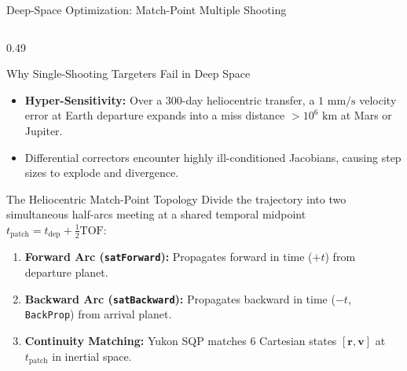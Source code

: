 \documentclass[aspectratio=169, 10pt]{beamer}
\begin{document}
\begin{frame}{Deep-Space Optimization: Match-Point Multiple Shooting}
    \begin{columns}[T]
        \begin{column}{0.49\textwidth}
            \begin{block}{Why Single-Shooting Targeters Fail in Deep Space}
                \scriptsize
                \begin{itemize}\setlength{\itemsep}{1.5pt}\setlength{\topsep}{0pt}
                    \item \textbf{Hyper-Sensitivity:} Over a 300-day heliocentric transfer, a $1\text{ mm/s}$ velocity error at Earth departure expands into a miss distance $> 10^6\text{ km}$ at Mars or Jupiter.
                    \item Differential correctors encounter highly ill-conditioned Jacobians, causing step sizes to explode and divergence.
                \end{itemize}
            \end{block}
            \vspace{-0.15cm}
            \begin{exampleblock}{The Heliocentric Match-Point Topology}
                \scriptsize
                Divide the trajectory into two simultaneous half-arcs meeting at a shared temporal midpoint $t_{\text{patch}} = t_{\text{dep}} + \frac{1}{2}\text{TOF}$:
                \begin{enumerate}\setlength{\itemsep}{1.2pt}\setlength{\topsep}{0pt}
                    \item \textbf{Forward Arc (\texttt{satForward}):} Propagates forward in time ($+t$) from departure planet.
                    \item \textbf{Backward Arc (\texttt{satBackward}):} Propagates backward in time ($-t$, \texttt{BackProp}) from arrival planet.
                    \item \textbf{Continuity Matching:} Yukon SQP matches 6 Cartesian states $[\mathbf{r}, \mathbf{v}]$ at $t_{\text{patch}}$ in inertial space.
                \end{enumerate}
            \end{exampleblock}
        \end{column}


\end{columns}
\end{frame}
\end{document}

